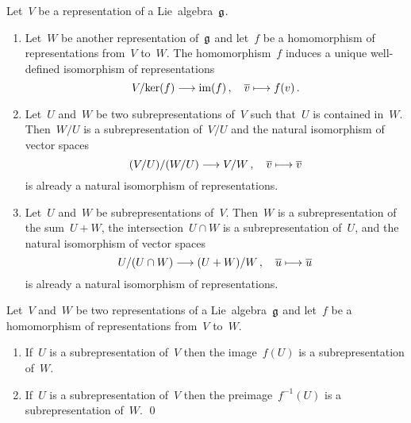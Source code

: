 \begin{corollary}
  Let~$V$ be a representation of a Lie~algebra~$\mathfrak{g}$.
  \begin{enumerate}
    \item
      Let~$W$ be another representation of~$\mathfrak{g}$ and let~$f$ be a homomorphism of representations from~$V$ to~$W$.
      The homomorphism~$f$ induces a unique well-defined isomorphism of representations
      \[
        V/{\ker(f)}
        \to
        \im(f) \,,
        \quad
        \class{v}
        \mapsto
        f(v)  \,.
      \]
    \item
      Let~$U$ and~$W$ be two subrepresentations of~$V$ such that~$U$ is contained in~$W$.
      Then~$W/U$ is a subrepresentation of~$V/U$ and the natural isomorphism of vector spaces
      \[
        (V/U) / (W/U)
        \to
        V/W \,,
        \quad
        \class{v}
        \mapsto
        \class{v}
      \]
      is already a natural isomorphism of representations.
    \item
      Let~$U$ and~$W$ be subrepresentations of~$V$.
      Then~$W$ is a subrepresentation of the sum~$U+W$, the intersection~$U \cap W$ is a subrepresentation of~$U$, and the natural isomorphism of vector spaces
      \[
        U/(U \cap W)
        \to
        (U + W)/W  \,,
        \quad
        \class{u}
        \mapsto
        \class{u}
      \]
      is already a natural isomorphism of representations.
  \end{enumerate}
\end{corollary}


\begin{lemma}
  Let~$V$ and~$W$ be two representations of a Lie~algebra~$\mathfrak{g}$ and let~$f$ be a homomorphism of representations from~$V$ to~$W$.
  \begin{enumerate}
    \item
      If~$U$ is a subrepresentation of~$V$ then the image~$f(U)$ is a subrepresentation of~$W$.
    \item
      If~$U$ is a subrepresentation of~$V$ then the preimage~$f^{-1}(U)$ is a subrepresentation of~$W$.
    \qed
  \end{enumerate}
\end{lemma}


